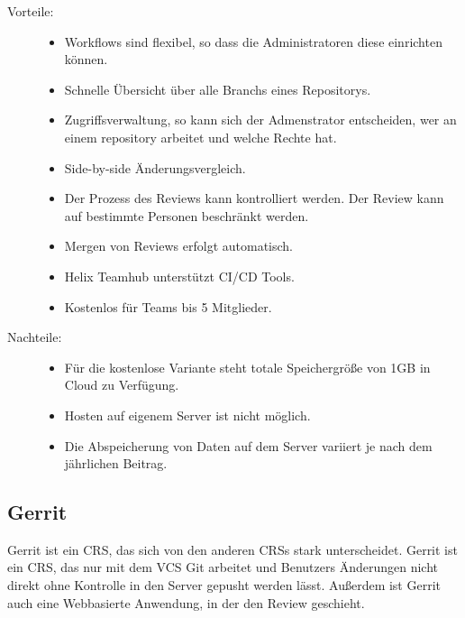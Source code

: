 \begin{description}
	\item [Vorteile:] \hfill
	\begin{itemize}
		\item Workflows sind flexibel, so dass die Administratoren diese einrichten können.
		\item Schnelle Übersicht über alle Branchs eines Repositorys.
		\item Zugriffsverwaltung, so kann sich der Admenstrator entscheiden, wer an einem repository arbeitet und welche Rechte hat.
		\item Side-by-side Änderungsvergleich.
		\item Der Prozess des Reviews kann kontrolliert werden. Der Review kann auf bestimmte Personen beschränkt werden.
		\item Mergen von Reviews erfolgt automatisch.
		\item Helix Teamhub unterstützt \ac{CI}/\ac{CD} Tools.
		\item Kostenlos für Teams bis 5 Mitglieder.
	\end{itemize}
	
	\item [Nachteile:] \hfill
	\begin{itemize}
	\item Für die kostenlose Variante steht totale Speichergröße von 1GB in Cloud zu Verfügung.
	\item Hosten auf eigenem Server ist nicht möglich.
	\item Die Abspeicherung von Daten auf dem Server variiert je nach dem jährlichen Beitrag.
	\end{itemize}
\end{description}


\subsection{Gerrit}
\label{subsec:Gerrit}

Gerrit ist ein \ac{CRS}, das sich von den anderen \acp{CRS} stark unterscheidet. Gerrit ist ein \ac{CRS}, das nur mit dem \ac{VCS} Git arbeitet und Benutzers Änderungen nicht direkt ohne Kontrolle in den Server gepusht werden lässt. Außerdem ist Gerrit auch eine Webbasierte Anwendung, in der den Review geschieht.

